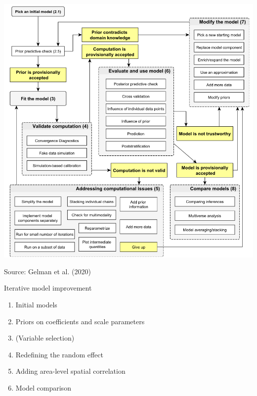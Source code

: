 \begin{frame}
    \vspace{-1cm}
    \centering
    \includegraphics[width=0.75\linewidth]{../graphics/workflow}

    \scriptsize{Source: Gelman et al. (2020)}
\end{frame}

\begin{frame}{Iterative model improvement}
    \begin{enumerate}
        \item Initial models
        \item Priors on coefficients and scale parameters
        \item (Variable selection)
        \item Redefining the random effect
        \item Adding area-level spatial correlation
        \item Model comparison
    \end{enumerate}
\end{frame}

